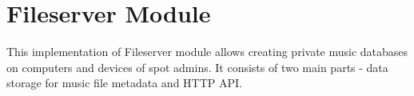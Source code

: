 \section{Fileserver Module}

This implementation of Fileserver module allows creating private music databases on computers and devices of spot admins. It consists of two main parts - data storage for music file metadata and HTTP API.


